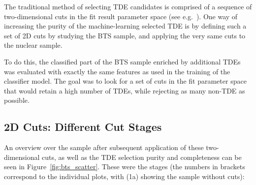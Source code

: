 The traditional method of selecting TDE candidates is comprised of a sequence of two-dimensional cuts in the fit result parameter space (see e.g.~\cite{Velzen2019}). One way of increasing the purity of the machine-learning selected TDE is by defining such a set of 2D cuts by studying the BTS sample, and applying the very same cuts to the nuclear sample.

To do this, the classified part of the BTS sample enriched by additional TDEs was evaluated with exactly the same features as used in the training of the classifier model. The goal was to look for a set of cuts in the fit parameter space that would retain a high number of TDEs, while rejecting as many non-TDE as possible.

\subsection{2D Cuts: Different Cut Stages}
An overview over the sample after subsequent application of these two-dimensional cuts, as well as the TDE selection purity and completeness can be seen in Figure~\ref{fig:bts_scatter}. These were the stages (the numbers in brackets correspond to the individual plots, with (1a) showing the sample without cuts):

